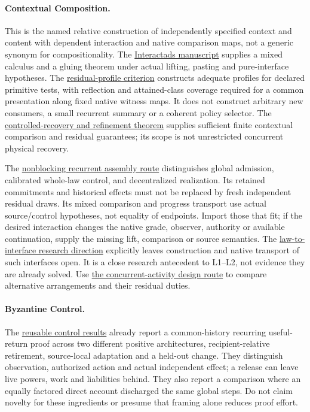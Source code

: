 \documentclass[11pt]{article}
\newcommand{\repo}[2]{\href{https://github.com/eternal-november/eos-research-programmes/blob/4359a8a1484498b9c46d8e58a0112448a1fba06b/projects/#1}{#2}}
\begin{document}
\paragraph{Contextual Composition.} This is the named relative construction of independently specified context and content with dependent interaction and native comparison maps, not a generic synonym for compositionality. The \repo{contextual-composition/publications/interactads/Interactads.tex}{Interactads manuscript} supplies a mixed calculus and a gluing theorem under actual lifting, pasting and pure-interface hypotheses. The \repo{contextual-composition/feedback-and-concurrency/observable-covers/Residual_Profiles_and_Admission_Reflection.tex}{residual-profile criterion} constructs adequate profiles for declared primitive tests, with reflection and attained-class coverage required for a common presentation along fixed native witness maps. It does not construct arbitrary new consumers, a small recurrent summary or a coherent policy selector. The \repo{contextual-composition/protocols/refinement-recovery/Contextual_Refinement_and_Controlled_Recovery.tex}{controlled-recovery and refinement theorem} supplies sufficient finite contextual comparison and residual guarantees; its scope is not unrestricted concurrent physical recovery.

The \repo{contextual-composition/foundations/native-whole-scope-feedback/Nonblocking_Recurrent_Assembly_Reading_Route.tex}{nonblocking recurrent assembly route} distinguishes global admission, calibrated whole-law control, and decentralized realization. Its retained commitments and historical effects must not be replaced by fresh independent residual draws. Its mixed comparison and progress transport use actual source/control hypotheses, not equality of endpoints. Import those that fit; if the desired interaction changes the native grade, observer, authority or available continuation, supply the missing lift, comparison or source semantics. The \repo{contextual-composition/research-directions/from-joint-requirements-to-interfaces.md}{law-to-interface research direction} explicitly leaves construction and native transport of such interfaces open. It is a close research antecedent to L1--L2, not evidence they are already solved. Use \repo{contextual-composition/research-directions/designing-concurrent-interactions.md}{the concurrent-activity design route} to compare alternative arrangements and their residual duties.

\paragraph{Byzantine Control.} The \repo{byzantine-control/portability/COMPLETION-AUDIT.md}{reusable control results} already report a common-history recurring useful-return proof across two different positive architectures, recipient-relative retirement, source-local adaptation and a held-out change. They distinguish observation, authorized action and actual independent effect; a release can leave live powers, work and liabilities behind. They also report a comparison where an equally factored direct account discharged the same global steps. Do not claim novelty for these ingredients or presume that framing alone reduces proof effort.
\end{document}
